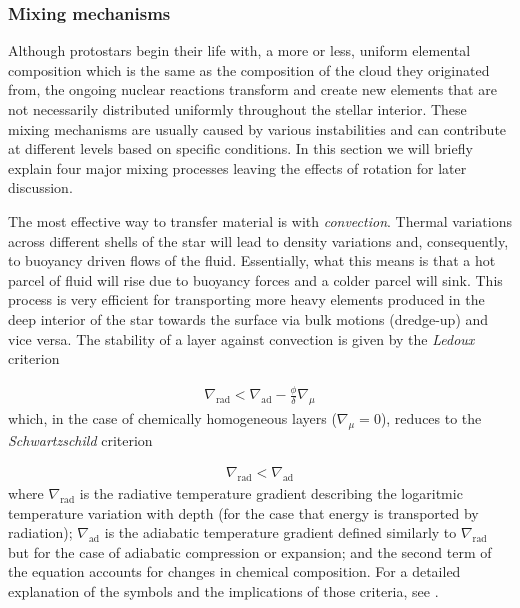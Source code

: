 \documentclass[../../main/thesis_msc.tex]{subfiles}
\begin{document}
					\subsubsection{Mixing mechanisms}
					
						Although protostars begin their life with, a more or less, uniform elemental composition which is the same as the composition of the cloud they originated from, the ongoing nuclear reactions transform and create new elements that are not necessarily distributed uniformly throughout the stellar interior. These mixing mechanisms are usually caused by various instabilities and can contribute at different levels based on specific conditions. In this section we will briefly explain four major mixing processes leaving the effects of rotation for later discussion.
						
						The most effective way to transfer material is with \emph{convection}. Thermal variations across different shells of the star will lead to density variations and, consequently, to buoyancy driven flows of the fluid. Essentially, what this means is that a hot parcel of fluid will rise due to buoyancy forces and a colder parcel will sink. This process is very efficient for transporting more heavy elements produced in the deep interior of the star towards the surface via bulk motions (dredge-up) and vice versa. The stability of a layer against convection is given by the \emph{Ledoux} criterion
						
						\begin{eqnarray}\label{eq:ledoux}
							\nabla_{\text{rad}} < \nabla_{\text{ad}} - \frac{\phi}{\delta} \nabla_{\mu}
						\end{eqnarray}
						which, in the case of chemically homogeneous layers ($\nabla_{\mu} = 0$), reduces to the \emph{Schwartzschild} criterion
						
						\begin{eqnarray}\label{eq:schwarzschild}
							\nabla_{\text{rad}} < \nabla_{\text{ad}}
						\end{eqnarray}
						where $\nabla_{\text{rad}}$ is the radiative temperature gradient describing the logaritmic temperature variation with depth (for the case that energy is transported by radiation); $\nabla_{\text{ad}}$ is the adiabatic temperature gradient defined similarly to $\nabla_{\text{rad}}$ but for the case of adiabatic compression or expansion; and the second term of the equation accounts for changes in chemical composition. For a detailed explanation of the symbols and the implications of those criteria, see \cite[pp.~49-51]{Kipp_book}.
						
\end{document}
